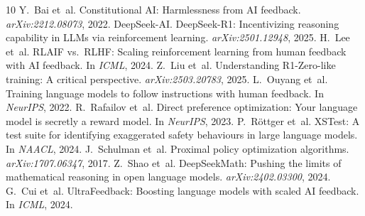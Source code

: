 \documentclass{article}
\begin{document}
\begingroup\small

\begin{thebibliography}{10}\setlength{\itemsep}{0pt}
 Y.~Bai et~al. Constitutional AI: Harmlessness from AI feedback. \emph{arXiv:2212.08073}, 2022.
 DeepSeek-AI. DeepSeek-R1: Incentivizing reasoning capability in LLMs via reinforcement learning. \emph{arXiv:2501.12948}, 2025.
 H.~Lee et~al. RLAIF vs.\ RLHF: Scaling reinforcement learning from human feedback with AI feedback. In \emph{ICML}, 2024.
 Z.~Liu et~al. Understanding R1-Zero-like training: A critical perspective. \emph{arXiv:2503.20783}, 2025.
 L.~Ouyang et~al. Training language models to follow instructions with human feedback. In \emph{NeurIPS}, 2022.
 R.~Rafailov et~al. Direct preference optimization: Your language model is secretly a reward model. In \emph{NeurIPS}, 2023.
 P.~R\"ottger et~al. XSTest: A test suite for identifying exaggerated safety behaviours in large language models. In \emph{NAACL}, 2024.
 J.~Schulman et~al. Proximal policy optimization algorithms. \emph{arXiv:1707.06347}, 2017.
 Z.~Shao et~al. DeepSeekMath: Pushing the limits of mathematical reasoning in open language models. \emph{arXiv:2402.03300}, 2024.
 G.~Cui et~al. UltraFeedback: Boosting language models with scaled AI feedback. In \emph{ICML}, 2024.
\end{thebibliography}
\endgroup

\appendix
\end{document}
